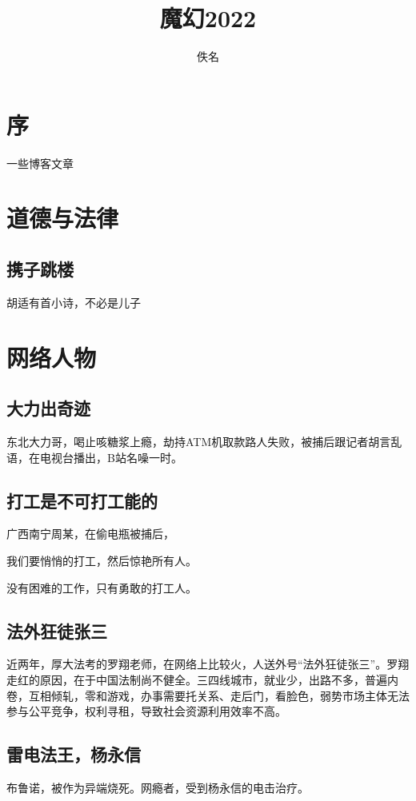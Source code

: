 \documentclass[fontset=founder]{ctexbook}
\author{佚名}
\title{魔幻2022}
\begin{document}
 
\maketitle%

\tableofcontents


\chapter*{序}
一些博客文章

\chapter{道德与法律}
\section{携子跳楼}
胡适有首小诗，不必是儿子

\chapter{网络人物}

\section{大力出奇迹}
东北大力哥，喝止咳糖浆上瘾，劫持ATM机取款路人失败，被捕后跟记者胡言乱语，在电视台播出，B站名噪一时。

\section{打工是不可打工能的}
广西南宁周某，在偷电瓶被捕后，

我们要悄悄的打工，然后惊艳所有人。

没有困难的工作，只有勇敢的打工人。

\section{法外狂徒张三}
近两年，厚大法考的罗翔老师，在网络上比较火，人送外号“法外狂徒张三”。罗翔走红的原因，在于中国法制尚不健全。三四线城市，就业少，出路不多，普遍内卷，互相倾轧，零和游戏，办事需要托关系、走后门，看脸色，弱势市场主体无法参与公平竞争，权利寻租，导致社会资源利用效率不高。

\section{雷电法王，杨永信}
布鲁诺，被作为异端烧死。网瘾者，受到杨永信的电击治疗。
\end{document}
